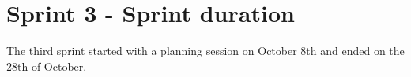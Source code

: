 \section{Sprint 3 - Sprint duration}
The third sprint started with a planning session on October 8th and ended on the 28th of October. 

